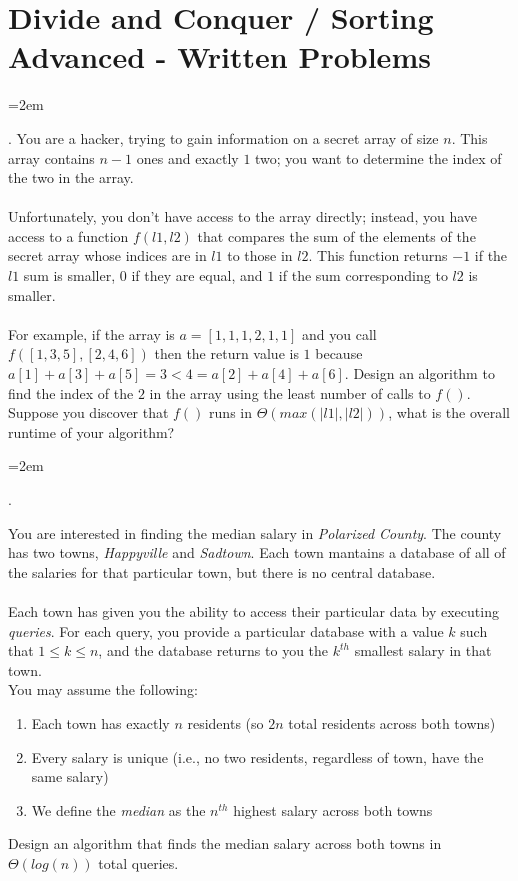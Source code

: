 \documentclass[12pt]{article}
\def\homework{Divide and Conquer / Sorting Advanced - Written Problems}
\newcounter{quesnum}
\newcommand{\question}[2][??]{
\begin{list}{\labelitemi}{\leftmargin=2em}
\item [\arabic{quesnum}.] {} {#2}
\end{list}
\addtocounter{quesnum}{1}
}
\begin{document}
\section*{\homework}


\question[3]{
You are a hacker, trying to gain information on a secret array of size $n$. This array contains $n-1$ ones and exactly $1$ two; you want to determine the index of the two in the array.\\
\\
Unfortunately, you don't have access to the array directly; instead, you have access to a function $f(l1, l2)$ that compares the sum of the elements of the secret array whose indices are in $l1$ to those in $l2$. This function returns $-1$ if the $l1$ sum is smaller, $0$ if they are equal, and $1$ if the sum corresponding to $l2$ is smaller.\\
\\
For example, if the array is $a=[1,1,1,2,1,1]$ and you call $f([1,3,5],[2,4,6])$ then the return value is $1$ because $a[1]+a[3]+a[5]=3<4=a[2]+a[4]+a[6]$. Design an algorithm to find the index of the $2$ in the array using the least number of calls to $f()$. Suppose you discover that $f()$ runs in $\Theta(max(|l1|,|l2|))$, what is the overall runtime of your algorithm? 
}



\question[3]{
You are interested in finding the median salary in \emph{Polarized County}. The county has two towns, \emph{Happyville} and \emph{Sadtown}. Each town mantains a database of all of the salaries for that particular town, but there is no central database.\\
\\
Each town has given you the ability to access their particular data by executing \emph{queries}. For each query, you provide a particular database with a value $k$ such that $1 \leq k \leq n$, and the database returns to you the $k^{th}$ smallest salary in that town.
\\
You may assume the following:

\begin{enumerate}
\item Each town has exactly $n$ residents (so $2n$ total residents across both towns)
\item Every salary is unique (i.e., no two residents, regardless of town, have the same salary) 
\item We define the \emph{median} as the $n^{th}$ highest salary across both towns
\end{enumerate}

Design an algorithm that finds the median salary across both towns in $\Theta(log(n))$ total queries.
}
\end{document}

